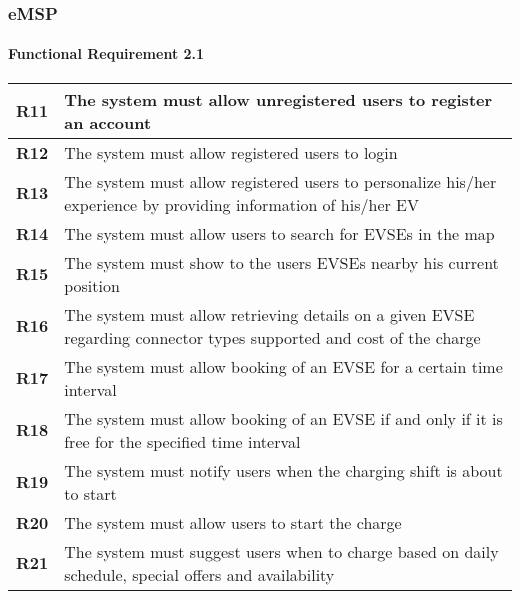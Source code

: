 \subsubsection{eMSP}
\paragraph*{Functional Requirement 2.1}
\begin{table}[h]
    \begin{tabular}{|l|l|}
        \toprule
        \textbf{R11} & The system must allow unregistered users to register an account                                                     \\ \midrule
        \textbf{R12} & The system must allow registered users to login                                                                     \\ \midrule
        \textbf{R13} & The system must allow registered users to personalize his/her experience by providing information of his/her EV     \\ \midrule
        \textbf{R14} & The system must allow users to search for EVSEs in the map                                                          \\ \midrule
        \textbf{R15} & The system must show to the users EVSEs nearby his current position                                                 \\ \midrule
        \textbf{R16} & The system must allow retrieving details on a given EVSE regarding connector types supported and cost of the charge \\ \midrule
        \textbf{R17} & The system must allow booking of an EVSE for a certain time interval                                                \\ \midrule
        \textbf{R18} & The system must allow booking of an EVSE if and only if it is free for the specified time interval                  \\ \midrule
        \textbf{R19} & The system must notify users when the charging shift is about to start                                              \\ \midrule
        \textbf{R20} & The system must allow users to start the charge                                                                     \\ \midrule
        \textbf{R21} & The system must suggest users when to charge based on daily schedule, special offers and availability               \\ \midrule

\end{tabular}
\end{table}
